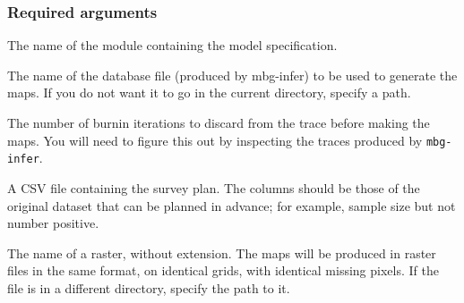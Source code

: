 \subsubsection{Required arguments%
}
\setcounter{listcnt0}{0}
\begin{list}{.}
{
\setlength{\rightmargin}{\leftmargin}
}

\item The name of the module containing the model specification.

\item The name of the database file (produced by mbg-infer) to be used to generate the
maps. If you do not want it to go in the current directory, specify a path.

\item The number of burnin iterations to discard from the trace before making the maps.
You will need to figure this out by inspecting the traces produced by \texttt{mbg-infer}.

\item A CSV file containing the survey plan. The columns should be those of the original
dataset that can be planned in advance; for example, sample size but not number
positive.

\item The name of a raster, without extension. The maps will be produced in raster files
in the same format, on identical grids, with identical missing pixels. If the file
is in a different directory, specify the path to it.
\end{list}




